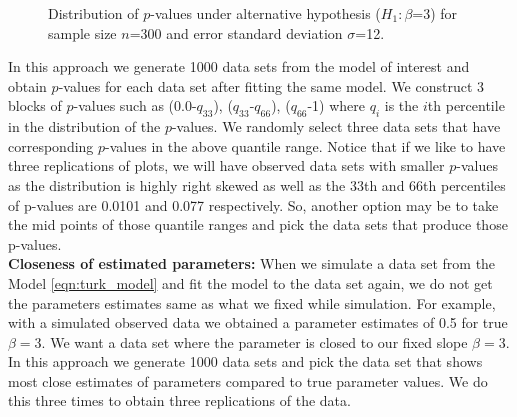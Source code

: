 \documentclass[11pt]{article}
\begin{document}
\begin{figure}[hbtp]
   \centering
       \caption{Distribution of $p$-values under alternative hypothesis ($H_1: \beta$=3) for sample size $n$=300 and error standard deviation $\sigma$=12.}
       \label{fig:dist_pvalue}
\end{figure}

In this approach we generate 1000 data sets from the model of interest and obtain $p$-values for each data set after fitting the same model. We construct 3 blocks of $p$-values such as (0.0-$q_{33}$), ($q_{33}$-$q_{66}$), ($q_{66}$-1) where $q_i$ is the $i$th percentile in the distribution of the $p$-values. We randomly select three data sets that have corresponding $p$-values in the above quantile range.  Notice that if we like to have three replications of plots, we will have observed data sets with smaller $p$-values as the distribution is highly right skewed as well as the 33th and 66th percentiles of p-values are 0.0101 and 0.077 respectively. So, another option may be to take the mid points of those quantile ranges and pick the data sets that produce those p-values. \\

{\bf Closeness of estimated parameters:} When we simulate a data set from the Model \eqref{eqn:turk_model} and fit the model to the data set again, we do not get the parameters estimates same as what we fixed while simulation. For example, with a simulated observed data we obtained a parameter estimates of 0.5 for true $\beta=3$. We want a data set where the parameter is closed to our fixed slope $\beta=3$.  In this approach we generate 1000 data sets and pick the data set that shows most close estimates of parameters compared to true parameter values. We do this three times to obtain three replications of the data.
\end{document}
